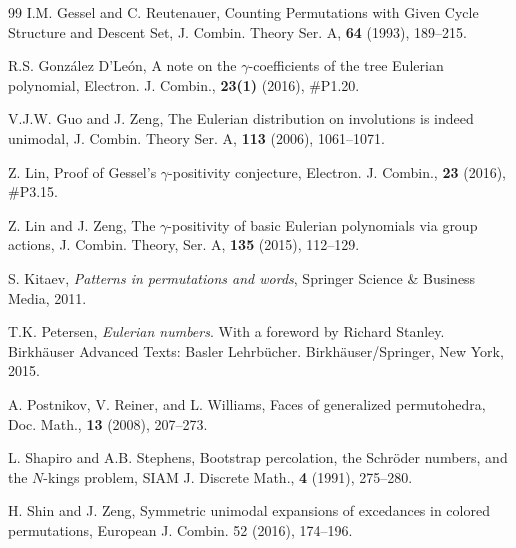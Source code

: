 \documentclass[12pt]{amsart}
\numberwithin{equation}{section}
\theoremstyle{plain}
\theoremstyle{definition}
\begin{document}
\begin{thebibliography}{99}
 I.M. Gessel and C. Reutenauer, Counting Permutations with Given Cycle Structure and Descent Set, J. Combin. Theory Ser. A, {\bf64} (1993), 189--215. 

 R.S. Gonz\'alez D'Le\'on, A note on the $\gamma$-coefficients of the tree Eulerian polynomial, Electron. J. Combin., {\bf23(1)} (2016), \#P1.20.

V.J.W. Guo and J. Zeng, The Eulerian distribution on involutions is indeed unimodal, J. Combin. Theory Ser. A, {\bf113} (2006), 1061--1071.

 Z. Lin, Proof of Gessel's $\gamma$-positivity conjecture,  Electron. J. Combin., {\bf23}     (2016), \#P3.15.

 Z. Lin and J. Zeng, 
The $\gamma$-positivity of basic Eulerian polynomials via group actions, 
J. Combin. Theory, Ser.  A, {\bf135} (2015), 112--129.

 S. Kitaev, {\em Patterns in permutations and words}, Springer Science \& Business Media, 2011.

T.K. Petersen,  {\em Eulerian numbers}. With a foreword by Richard Stanley. Birkh\"auser Advanced Texts: Basler Lehrb\"ucher. Birkh\"auser/Springer, New York, 2015.
%



A. Postnikov, V. Reiner, and L. Williams, Faces of generalized permutohedra,
Doc. Math., {\bf13} (2008), 207--273.

L. Shapiro and A.B. Stephens,
Bootstrap percolation, the Schr\"oder numbers, and the $N$-kings problem,
SIAM J. Discrete Math., {\bf4} (1991),  275--280. 

H. Shin and J. Zeng, Symmetric unimodal expansions of excedances in colored permutations, European
J. Combin. 52 (2016), 174--196.
%

  


\end{thebibliography}
\end{document}
